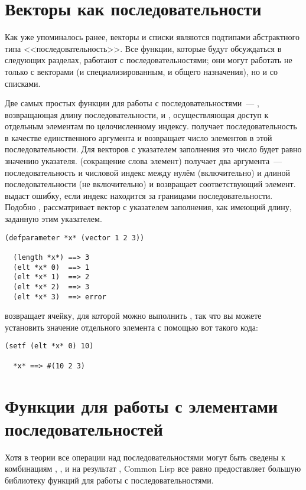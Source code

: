 \section{Векторы как последовательности}

Как уже упоминалось ранее, векторы и списки являются подтипами абстрактного типа
<<последовательность>>.  Все функции, которые будут обсуждаться в следующих разделах,
работают с последовательностями; они могут работать не только с векторами (и
специализированным, и общего назначения), но и со списками.

Две самых простых функции для работы с последовательностями~--- ,
возвращающая длину последовательности, и , осуществляющая доступ к
отдельным элементам по целочисленному индексу.   получает
последовательность в качестве единственного аргумента и возвращает число элементов в этой
последовательности.  Для векторов с указателем заполнения это число будет равно значению
указателя.  (сокращение слова элемент) получает два аргумента~---
последовательность и числовой индекс между нулём (включительно) и длиной
последовательности (не включительно) и возвращает соответствующий элемент.   выдаст ошибку,
если индекс находится за границами последовательности.  Подобно , 
рассматривает вектор с указателем заполнения, как имеющий длину, заданную этим
указателем.

\begin{lstlisting}[style=lisprepl]
  (defparameter *x* (vector 1 2 3))
  
  (length *x*) ==> 3
  (elt *x* 0)  ==> 1
  (elt *x* 1)  ==> 2
  (elt *x* 2)  ==> 3
  (elt *x* 3)  ==> error
\end{lstlisting}

 возвращает ячейку, для которой можно выполнить , так что вы можете
установить значение отдельного элемента с помощью вот такого кода:

\begin{lstlisting}[style=lisprepl]
  (setf (elt *x* 0) 10)
  
  *x* ==> #(10 2 3)
\end{lstlisting}

\section{Функции для работы с элементами последовательностей}

Хотя в теории все операции над последовательностями могут быть сведены к комбинациям
, , и  на результат , Common Lisp все равно
предоставляет большую библиотеку функций для работы с последовательностями.

